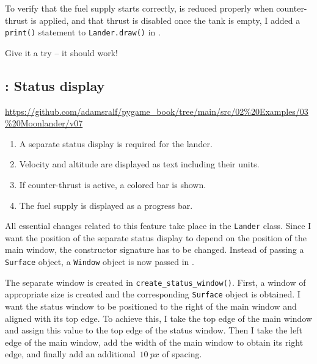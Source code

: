 
To verify that the fuel supply starts correctly, is reduced properly when counter-thrust is applied, and that thrust is disabled once the tank is empty, I added a \texttt{print()} statement to \texttt{Lander.draw()} in .


Give it a try -- it should work!


\subsection{: Status display}
\begin{diskbox}
	\url{https://github.com/adamsralf/pygame_book/tree/main/src/02%20Examples/03%20Moonlander/v07}
\end{diskbox}

\begin{enumerate}
	\item A separate status display is required for the lander.\label{reqStatusWindow}
	\item Velocity and altitude are displayed as text including their units.\label{reqStatusGH}
	\item If counter-thrust is active, a colored bar is shown.\label{reqStatusSchub}
	\item The fuel supply is displayed as a progress bar.\label{reqStatusTreibstoff}
\end{enumerate}
\er

All essential changes related to this feature take place in the \texttt{Lander} class. Since I want the position of the separate status display to depend on the position of the main window, the constructor signature has to be changed. Instead of passing a \texttt{Surface} object, a \texttt{Window} object is now passed in .


The separate window is created in \texttt{create\_status\_window()}. First, a window of appropriate size is created and the corresponding \texttt{Surface} object is obtained. I want the status window to be positioned to the right of the main window and aligned with its top edge. To achieve this, I take the top edge of the main window and assign this value to the top edge of the status window. Then I take the left edge of the main window, add the width of the main window to obtain its right edge, and finally add an additional~$\SI{10}{px}$ of spacing.

